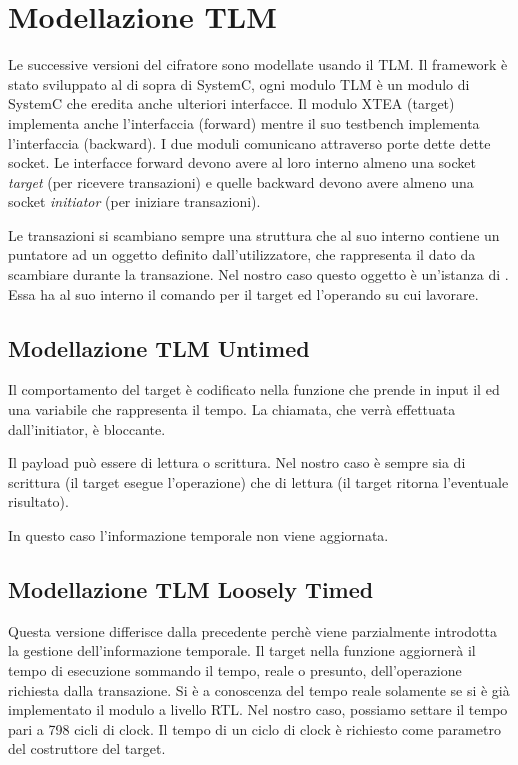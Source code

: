 \newpage
\section{Modellazione TLM}

Le successive versioni del cifratore sono modellate usando il TLM. Il framework è stato sviluppato al di sopra di SystemC, ogni modulo TLM è un modulo di SystemC che eredita anche ulteriori interfacce. Il modulo XTEA (target) implementa anche l'interfaccia  (forward) mentre il suo testbench implementa l'interfaccia  (backward). I due moduli comunicano attraverso porte dette dette socket. Le interfacce forward devono avere al loro interno almeno una socket \emph{target} (per ricevere transazioni) e quelle backward devono avere almeno una socket \emph{initiator} (per iniziare transazioni). 

Le transazioni si scambiano sempre una struttura  che al suo interno contiene un puntatore ad un oggetto definito dall'utilizzatore, che rappresenta il dato da scambiare durante la transazione. Nel nostro caso questo oggetto è un'istanza di . Essa ha al suo interno il comando per il target ed l'operando su cui lavorare. 

\subsection{Modellazione TLM Untimed}

Il comportamento del target è codificato nella funzione  che prende in input il  ed una variabile che rappresenta il tempo. La chiamata, che verrà effettuata dall'initiator, è bloccante.

Il payload può essere di lettura o scrittura. Nel nostro caso è sempre sia di scrittura (il target esegue l'operazione) che di lettura (il target ritorna l'eventuale risultato). 

In questo caso l'informazione temporale non viene aggiornata. 

\subsection{Modellazione TLM Loosely Timed}

Questa versione differisce dalla precedente perchè viene parzialmente introdotta la gestione dell'informazione temporale. Il target nella funzione  aggiornerà il tempo di esecuzione sommando il tempo, reale o presunto, dell'operazione richiesta dalla transazione. Si è a conoscenza del tempo reale solamente se si è già implementato il modulo a livello RTL. Nel nostro caso, possiamo settare il tempo pari a 798 cicli di clock. Il tempo di un ciclo di clock è richiesto come parametro del costruttore del target. 

